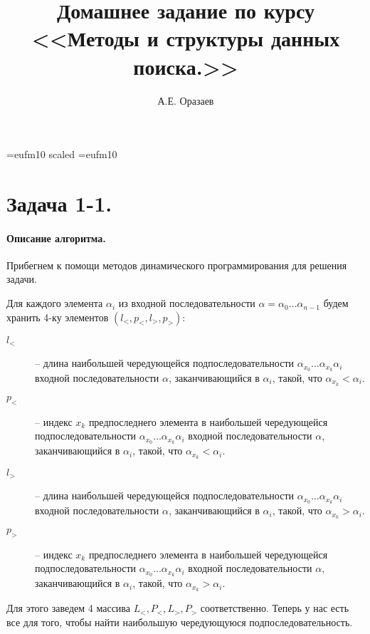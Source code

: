 \documentclass[12pt]{article}
\title{\bf Домашнее задание по курсу \\ <<Методы
и структуры данных поиска.>>}
\author{А.Е. Оразаев}
\date{}
\begin{document}
\voffset=-20mm 
\hoffset=-12mm
\font\Got=eufm10 scaled \font\Got=eufm10

\maketitle

\section{Задача 1-1.}
\paragraph{Описание алгоритма.}
Прибегнем к помощи методов динамического программирования для решения задачи.

Для каждого элемента $ \alpha_i $ из входной последовательности $ \alpha = \alpha_0 \dots \alpha_{n-1} $
будем хранить 4-ку элементов $(l_<,p_<,l_>,p_>)$:
\begin{description}
    \item[$ l_< $] -- длина наибольшей чередующейся подпоследовательности $ \alpha_{x_0} \dots \alpha_{x_k} \alpha_i$
    входной последовательности $ \alpha $, заканчивающийся в $ \alpha_i $, такой, что $ \alpha_{x_k} < \alpha_i $.

    \item[$ p_< $] -- индекс $ x_k $ предпоследнего элемента в наибольшей чередующейся подпоследовательности
    $ \alpha_{x_0} \dots \alpha_{x_k} \alpha_i$ входной последовательности $ \alpha $,
    заканчивающийся в $ \alpha_i $, такой, что $ \alpha_{x_k} < \alpha_i $.

    \item[$ l_> $] -- длина наибольшей чередующейся подпоследовательности $ \alpha_{x_0} \dots \alpha_{x_k} \alpha_i$
    входной последовательности $ \alpha $, заканчивающийся в $ \alpha_i $, такой, что $ \alpha_{x_k} > \alpha_i $.

    \item[$ p_> $] -- индекс $ x_k $ предпоследнего элемента в наибольшей чередующейся подпоследовательности
    $ \alpha_{x_0} \dots \alpha_{x_k} \alpha_i$ входной последовательности $ \alpha $,
    заканчивающийся в $ \alpha_i $, такой, что $ \alpha_{x_k} > \alpha_i $.
\end{description}

Для этого заведем 4 массива $ L_<,P_<,L_>,P_> $ соответственно.
Теперь у нас есть все для того, чтобы найти наибольшую чередующуюся подпоследовательность.
\end{document}
